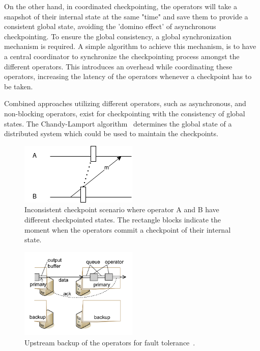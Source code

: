 On the other hand, in coordinated checkpointing, the operators will take a snapshot 
of their internal state at the same "time" and save them to provide a consistent 
global state, avoiding the 'domino effect' of asynchronous checkpointing. To ensure 
the global consistency, a global synchronization mechanism is required. A simple 
algorithm to achieve this mechanism, is to have a central coordinator to synchronize 
the checkpointing process amongst the different operators. This introduces an overhead 
while coordinating these operators, increasing the latency of the operators whenever a 
checkpoint has to be taken. 


Combined approaches utilizing different operators, such as asynchronous, and non-blocking
operators, exist for checkpointing with the consistency of global states. 
The Chandy-Lamport algorithm~\cite{chandy_lamport} determines the 
global state of a distributed system which could be used to maintain the checkpoints. 

\begin{figure}[!htbp]
    \centering
    \includegraphics{fig/checkpoint_inconsistency.png}
    \caption{Inconsistent checkpoint scenario where operator A and B have different
    checkpointed states. The rectangle blocks indicate the moment when the operators 
    commit a checkpoint of their internal state. }
    \label{fig:checkpoint_inconsistency}
\end{figure}


\begin{figure}[!htbp]
    \centering
    \includegraphics[width=0.5\textwidth]{fig/upstream.png}
    \caption{Upstream backup of the operators for fault tolerance~\cite{upstream_backup}.}
    \label{fig:upstream}
    
\end{figure}

